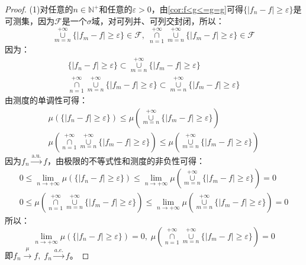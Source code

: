 \begin{proof}
	(1)对任意的$n\in\mathbb{N}^+$和任意的$\varepsilon>0$，由\cref{cor:f<g<=g=g}可得$\{|f_n-f|\geqslant\varepsilon\}$是可测集，因为$\mathscr{F}$是一个$\sigma$域，对可列并、可列交封闭，所以：
	\begin{equation*}
		\underset{m=n}{\overset{+\infty}{\cup}}\{|f_m-f|\geqslant\varepsilon\}\in \mathscr{F},\;\underset{n=1}{\overset{+\infty}{\cap}}\underset{m=n}{\overset{+\infty}{\cup}}\{|f_m-f|\geqslant\varepsilon\}\in \mathscr{F}
	\end{equation*}
	因为：
	\begin{gather*}
		\{|f_n-f|\geqslant\varepsilon\}\subset\underset{m=n}{\overset{+\infty}{\cup}}\{|f_m-f|\geqslant\varepsilon\} \\
		\underset{n=1}{\overset{+\infty}{\cap}}\underset{m=n}{\overset{+\infty}{\cup}}\{|f_m-f|\geqslant\varepsilon\}\subset\underset{m=n}{\overset{+\infty}{\cup}}\{|f_m-f|\geqslant\varepsilon\}
	\end{gather*}
	由测度的单调性可得：
	\begin{gather*}
		\mu(\{|f_n-f|\geqslant\varepsilon\})\leqslant\mu\left(\underset{m=n}{\overset{+\infty}{\cup}}\{|f_m-f|\geqslant\varepsilon\}\right) \\
		\mu\left(\underset{n=1}{\overset{+\infty}{\cap}}\underset{m=n}{\overset{+\infty}{\cup}}\{|f_m-f|\geqslant\varepsilon\}\right)\leqslant\mu\left(\underset{m=n}{\overset{+\infty}{\cup}}\{|f_m-f|\geqslant\varepsilon\}\right) 
	\end{gather*}
	因为$f_n\overset{\text{a.u.}}{\longrightarrow}f$，由极限的不等式性和测度的非负性可得：
	\begin{gather*}
		0\leqslant\lim_{n\to+\infty}\mu(\{|f_n-f|\geqslant\varepsilon\})\leqslant\lim_{n\to+\infty}\mu\left(\underset{m=n}{\overset{+\infty}{\cup}}\{|f_m-f|\geqslant\varepsilon\}\right)=0 \\
		0\leqslant\mu\left(\underset{n=1}{\overset{+\infty}{\cap}}\underset{m=n}{\overset{+\infty}{\cup}}\{|f_m-f|\geqslant\varepsilon\}\right)\leqslant\lim_{n\to+\infty}\mu\left(\underset{m=n}{\overset{+\infty}{\cup}}\{|f_m-f|\geqslant\varepsilon\}\right)=0
	\end{gather*}
	所以：
	\begin{equation*}
		\lim_{n\to+\infty}\mu(\{|f_n-f|\geqslant\varepsilon\})=0,\;\mu\left(\underset{n=1}{\overset{+\infty}{\cap}}\underset{m=n}{\overset{+\infty}{\cup}}\{|f_m-f|\geqslant\varepsilon\}\right)=0
	\end{equation*}
	即$f_n\overset{\mu}{\longrightarrow}f,\;f_n\overset{a.e.}{\longrightarrow}f$。\par

\end{proof}
